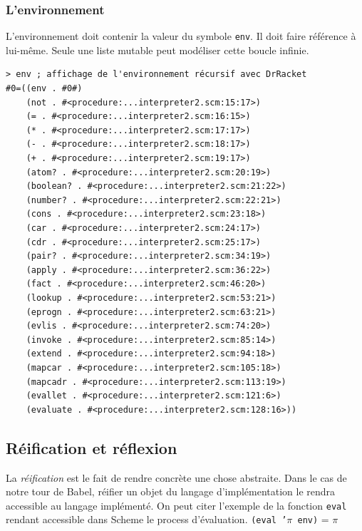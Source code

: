\subsubsection{L'environnement}
L'environnement doit contenir la valeur du symbole \texttt{env}. Il doit faire référence à lui-même.
Seule une liste mutable peut modéliser cette boucle infinie. 
\begin{verbatim}
> env ; affichage de l'environnement récursif avec DrRacket
#0=((env . #0#)
    (not . #<procedure:...interpreter2.scm:15:17>)
    (= . #<procedure:...interpreter2.scm:16:15>)
    (* . #<procedure:...interpreter2.scm:17:17>)
    (- . #<procedure:...interpreter2.scm:18:17>)
    (+ . #<procedure:...interpreter2.scm:19:17>)
    (atom? . #<procedure:...interpreter2.scm:20:19>)
    (boolean? . #<procedure:...interpreter2.scm:21:22>)
    (number? . #<procedure:...interpreter2.scm:22:21>)
    (cons . #<procedure:...interpreter2.scm:23:18>)
    (car . #<procedure:...interpreter2.scm:24:17>)
    (cdr . #<procedure:...interpreter2.scm:25:17>)
    (pair? . #<procedure:...interpreter2.scm:34:19>)
    (apply . #<procedure:...interpreter2.scm:36:22>)
    (fact . #<procedure:...interpreter2.scm:46:20>)
    (lookup . #<procedure:...interpreter2.scm:53:21>)
    (eprogn . #<procedure:...interpreter2.scm:63:21>)
    (evlis . #<procedure:...interpreter2.scm:74:20>)
    (invoke . #<procedure:...interpreter2.scm:85:14>)
    (extend . #<procedure:...interpreter2.scm:94:18>)
    (mapcar . #<procedure:...interpreter2.scm:105:18>)
    (mapcadr . #<procedure:...interpreter2.scm:113:19>)
    (evallet . #<procedure:...interpreter2.scm:121:6>)
    (evaluate . #<procedure:...interpreter2.scm:128:16>))
\end{verbatim}

\subsection{Réification et réflexion}
La \textit{réification} est le fait de rendre concrète une chose abstraite.
Dans le cas de notre tour de Babel, réifier un objet du langage d'implémentation le rendra accessible au langage implémenté.
On peut citer l'exemple de la fonction \texttt{eval} rendant accessible dans Scheme le process d'évaluation. 
\texttt{(eval '$\pi$ env)} = $\pi$

